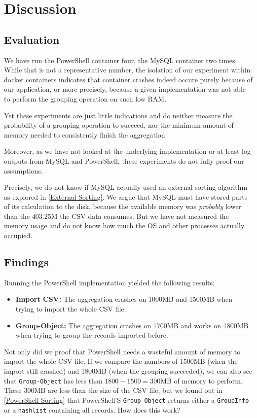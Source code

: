 \newpage

\section{Discussion}

\subsection{Evaluation} \label{Evaluation}

We have run the \gls{PowerShell} container four, the \gls{MySQL} container two times.
While that is not a representative number, the isolation of our experiment
within docker containers indicates that container crashes indeed occure
purely because of our application, or more precisely, because a given implementation
was not able to perform the grouping operation on such low \gls{RAM}.

Yet these experiments are just little indications and do neither measure
the probability of a grouping operation to succeed, nor the minimum amount
of memory needed to consistently finish the aggregation.

Moreover, as we have not looked at the underlying implementation or at least log
outputs from \gls{MySQL} and \gls{PowerShell}, these experiments do not fully proof our assumptions.

Precisely, we do not know if \gls{MySQL} actually used an external sorting algorithm
as explored in \ref{External Sorting}. We argue that \gls{MySQL} must have stored parts
of its calculation to the disk, because the available memory was \textit{probably}
lower than the $403.25$M the \gls{CSV} data consumes. But we have not measured
the memory usage and do not know how much the \gls{OS} and other processes actually occupied.

\subsection{Findings}

Running the \gls{PowerShell} implementation yielded the following results:

\begin{itemize}
    \item \textbf{Import CSV:} The aggregation crashes on 1000MB and 1500MB when
        trying to import the whole \gls{CSV} file.

    \item \textbf{Group-Object:} The aggregation crashes on 1700MB and works on 1800MB
    when trying to group the records imported before.
\end{itemize}
Not only did we proof that \gls{PowerShell} needs a wasteful amount of memory to
import the whole \gls{CSV} file. If we compare the numbers of 1500MB (when the import
still crashed) and 1800MB (when the grouping succeeded), we can also see that
\verb+Group-Object+ has less than $1800-1500=300$MB of memory to perform.
These 300MB are less than the size of the \gls{CSV} file, but we found out
in \ref{PowerShell Sorting} that \gls{PowerShell}'S \verb+Group-Object+
returns either a \verb+GroupInfo+ or a \verb+hashlist+ containing all records.
How does this work?

